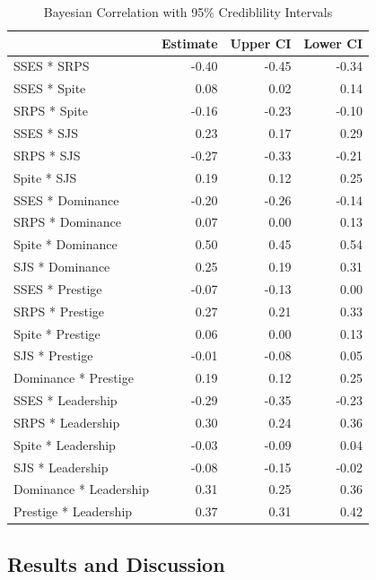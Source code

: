 \documentclass[
  donotrepeattitle,doc, 12pt, a4paper,floatsintext]{apa7}
\begin{document}
\begin{table}[tbp]

\begin{center}
\begin{threeparttable}

\caption{\label{tab:unnamed-chunk-9}Bayesian Correlation with 95\% Crediblility Intervals}

\begin{tabular}{lrrr}
\toprule
 & Estimate & Upper CI & Lower CI\\
\midrule
SSES * SRPS & -0.40 & -0.45 & -0.34\\
SSES * Spite & 0.08 & 0.02 & 0.14\\
SRPS * Spite & -0.16 & -0.23 & -0.10\\
SSES * SJS & 0.23 & 0.17 & 0.29\\
SRPS * SJS & -0.27 & -0.33 & -0.21\\
Spite * SJS & 0.19 & 0.12 & 0.25\\
SSES * Dominance & -0.20 & -0.26 & -0.14\\
SRPS * Dominance & 0.07 & 0.00 & 0.13\\
Spite * Dominance & 0.50 & 0.45 & 0.54\\
SJS * Dominance & 0.25 & 0.19 & 0.31\\
SSES * Prestige & -0.07 & -0.13 & 0.00\\
SRPS * Prestige & 0.27 & 0.21 & 0.33\\
Spite * Prestige & 0.06 & 0.00 & 0.13\\
SJS * Prestige & -0.01 & -0.08 & 0.05\\
Dominance * Prestige & 0.19 & 0.12 & 0.25\\
SSES * Leadership & -0.29 & -0.35 & -0.23\\
SRPS * Leadership & 0.30 & 0.24 & 0.36\\
Spite * Leadership & -0.03 & -0.09 & 0.04\\
SJS * Leadership & -0.08 & -0.15 & -0.02\\
Dominance * Leadership & 0.31 & 0.25 & 0.36\\
Prestige * Leadership & 0.37 & 0.31 & 0.42\\
\bottomrule
\end{tabular}

\end{threeparttable}
\end{center}

\end{table}

\hypertarget{results-and-discussion}{%
\subsection{Results and Discussion}\label{results-and-discussion}}
\end{document}
